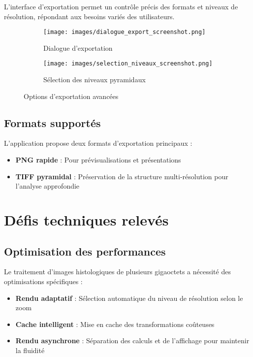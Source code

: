 \documentclass[11pt,a4paper]{report}
\begin{document}
L'interface d'exportation permet un contrôle précis des formats et niveaux de résolution, répondant aux besoins variés des utilisateurs.

\begin{figure}[htbp]
\centering
\begin{subfigure}[b]{0.48\textwidth}
    \texttt{[image: images/dialogue\_export\_screenshot.png]}
    \caption{Dialogue d'exportation}
\end{subfigure}
\hfill
\begin{subfigure}[b]{0.48\textwidth}
    \texttt{[image: images/selection\_niveaux\_screenshot.png]}
    \caption{Sélection des niveaux pyramidaux}
\end{subfigure}
\caption{Options d'exportation avancées}
\end{figure}

\subsection{Formats supportés}

L'application propose deux formats d'exportation principaux :

\begin{itemize}
\item \textbf{PNG rapide} : Pour prévisualisations et présentations
\item \textbf{TIFF pyramidal} : Préservation de la structure multi-résolution pour l'analyse approfondie
\end{itemize}

\section{Défis techniques relevés}

\subsection{Optimisation des performances}

Le traitement d'images histologiques de plusieurs gigaoctets a nécessité des optimisations spécifiques :

\begin{itemize}
\item \textbf{Rendu adaptatif} : Sélection automatique du niveau de résolution selon le zoom
\item \textbf{Cache intelligent} : Mise en cache des transformations coûteuses
\item \textbf{Rendu asynchrone} : Séparation des calculs et de l'affichage pour maintenir la fluidité
\end{itemize}
\end{document}
